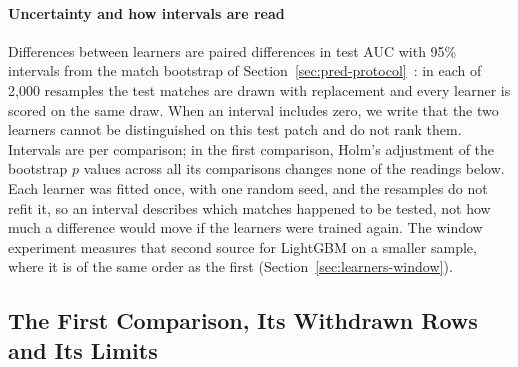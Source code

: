 \paragraph{Uncertainty and how intervals are read}
Differences between learners are paired differences in test AUC with 95\% intervals from the match
bootstrap of Section~\ref{sec:pred-protocol}~\cite{efron1993bootstrap}: in each of 2,000 resamples the
test matches are drawn with replacement and every learner is scored on the same draw. When an interval
includes zero, we write that the two learners cannot be distinguished on this test patch and do not rank
them. Intervals are per comparison; in the first comparison, Holm's adjustment of the bootstrap $p$ values
across all its comparisons changes none of the readings below. Each learner was fitted once, with one
random seed, and the resamples do not refit it, so an interval describes which matches happened to be
tested, not how much a difference would move if the learners were trained again. The window experiment
measures that second source for LightGBM on a smaller sample, where it is of the same order as the first
(Section~\ref{sec:learners-window}).

\subsection{The First Comparison, Its Withdrawn Rows and Its Limits}
\label{sec:learners-published}

